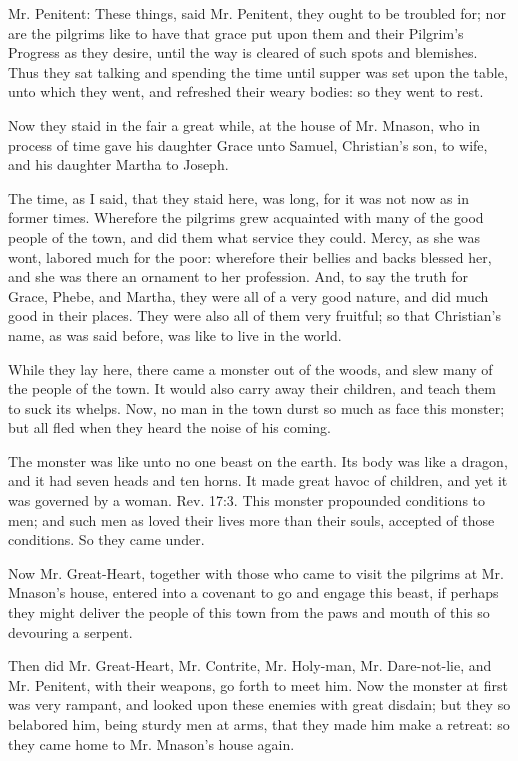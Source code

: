 Mr. Penitent: These things, said Mr. Penitent, they ought to be troubled for; nor are the pilgrims like to have that grace put upon them and their Pilgrim's Progress as they desire, until the way is cleared of such spots and blemishes. Thus they sat talking and spending the time until supper was set upon the table, unto which they went, and refreshed their weary bodies: so they went to rest.

Now they staid in the fair a great while, at the house of Mr. Mnason, who in process of time gave his daughter Grace unto Samuel, Christian's son, to wife, and his daughter Martha to Joseph.

The time, as I said, that they staid here, was long, for it was not now as in former times. Wherefore the pilgrims grew acquainted with many of the good people of the town, and did them what service they could. Mercy, as she was wont, labored much for the poor: wherefore their bellies and backs blessed her, and she was there an ornament to her profession. And, to say the truth for Grace, Phebe, and Martha, they were all of a very good nature, and did much good in their places. They were also all of them very fruitful; so that Christian's name, as was said before, was like to live in the world.

While they lay here, there came a monster out of the woods, and slew many of the people of the town. It would also carry away their children, and teach them to suck its whelps. Now, no man in the town durst so much as face this monster; but all fled when they heard the noise of his coming.

The monster was like unto no one beast on the earth. Its body was like a dragon, and it had seven heads and ten horns. It made great havoc of children, and yet it was governed by a woman. Rev. 17:3. This monster propounded conditions to men; and such men as loved their lives more than their souls, accepted of those conditions. So they came under.

Now Mr. Great-Heart, together with those who came to visit the pilgrims at Mr. Mnason's house, entered into a covenant to go and engage this beast, if perhaps they might deliver the people of this town from the paws and mouth of this so devouring a serpent.

Then did Mr. Great-Heart, Mr. Contrite, Mr. Holy-man, Mr. Dare-not-lie, and Mr. Penitent, with their weapons, go forth to meet him. Now the monster at first was very rampant, and looked upon these enemies with great disdain; but they so belabored him, being sturdy men at arms, that they made him make a retreat: so they came home to Mr. Mnason's house again.

